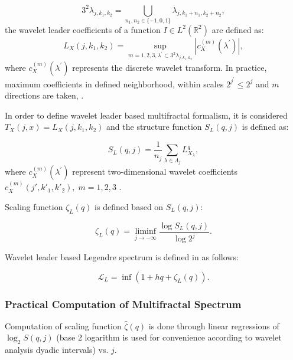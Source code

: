 \documentclass{article}
\begin{document}
\begin{equation}
	3^2\lambda_{j, k_1, k_2} = \displaystyle \bigcup_{n_1, n_2 \in \{-1, 0, 1\}} \lambda_{j, k_1 +n_1, k_2 +n_2},
\end{equation}
the wavelet leader coefficients of a function $I \in L^2(\mathbb{R}^2)$ are defined as:
\begin{equation}\label{leaders}
	L_X(j, k_1, k_2) = \sup_{m=1, 2, 3, \lambda^{\prime} \subset 3^2 \lambda_{j, k_1, k_2}} |c_X^{(m)} (\lambda^{\prime})|,
\end{equation}
where $c_X^{(m)} (\lambda^{\prime})$ represents the discrete wavelet transform. In practice, maximum coefficients in defined neighborhood, within scales $2^{j^{\prime}}\leq 2^j$ and $m$ directions are taken, \citep{wendt2009wavelet}.

In order to define wavelet leader based multifractal formalism, it is considered $T_X(j, x)= L_X(j, k_1, k_2)$ and the structure function $S_L(q, j)$ is defined as:

\begin{equation}
	S_L(q, j) = \frac{1}{n_j}\displaystyle \sum_{\lambda \in \Lambda_j} L_{X_{\lambda}}^q,
\end{equation} 	
where $c_X^{(m)}(\lambda ^{\prime})$ represent two-dimensional wavelet coefficients $c_{X}^{(m)}(j',k'_1,k'_2),\; m=1,2,3$ \citep{mallat1999wavelet}.

Scaling function $\zeta_L(q)$ is defined based on $S_L(q, j)$:

\begin{equation}
	\zeta_L(q) = \liminf_{j \rightarrow - \infty} {\frac{\log{S_L(q, j)}}{\log{2^j}}}.
\end{equation} 

Wavelet leader based Legendre spectrum is defined in \citep{wendt2009wavelet} as follows: 

\begin{equation}
	\mathcal{L}_L = \inf{(1+hq+\zeta_L(q))}.
\end{equation}


	\subsubsection{Practical Computation of Multifractal Spectrum}\label{practical_mfa}

Computation of scaling function $\hat{\zeta}(q)$ is done through linear regressions of $\log_2{S(q, j)}$ (base 2 logarithm is used for convenience according to wavelet analysis dyadic intervals) vs. $j$. 
\end{document}
